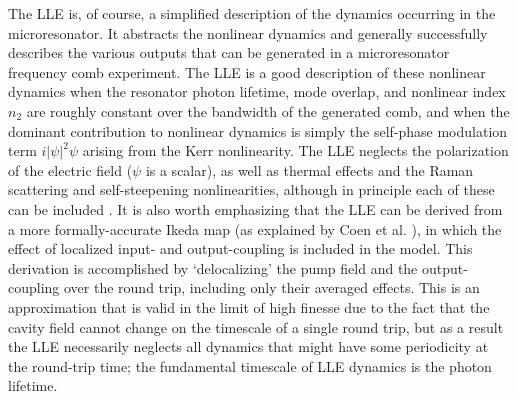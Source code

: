 The LLE is, of course, a simplified description of the dynamics occurring in the microresonator. It abstracts the nonlinear dynamics and generally successfully describes the various outputs that can be generated in a microresonator frequency comb experiment. The LLE is a good description of these nonlinear dynamics when the resonator photon lifetime, mode overlap, and nonlinear index $n_2$ are roughly constant over the bandwidth of the generated comb, and when the dominant contribution to nonlinear dynamics is simply the self-phase modulation term $i|\psi|^2\psi$ arising from the Kerr nonlinearity. The LLE neglects the polarization of the electric field ($\psi$ is a scalar), as well as thermal effects and the Raman scattering and self-steepening nonlinearities, although in principle each of these can be included \cite{Hansson2018,Herr2014,Chembo2015,Agrawal2007}. It is also worth emphasizing that the LLE can be derived from a more formally-accurate Ikeda map (as explained by Coen et al. \cite{Coen2013a}), in which the effect of localized input- and output-coupling is included in the model. This derivation is accomplished by `delocalizing' the pump field and the output-coupling over the round trip, including only their averaged effects. This is an approximation that is valid in the limit of high finesse due to the fact that the cavity field cannot change on the timescale of a single round trip, but as a result the LLE necessarily neglects all dynamics that might have some periodicity at the round-trip time; the fundamental timescale of LLE dynamics is the photon lifetime. 





